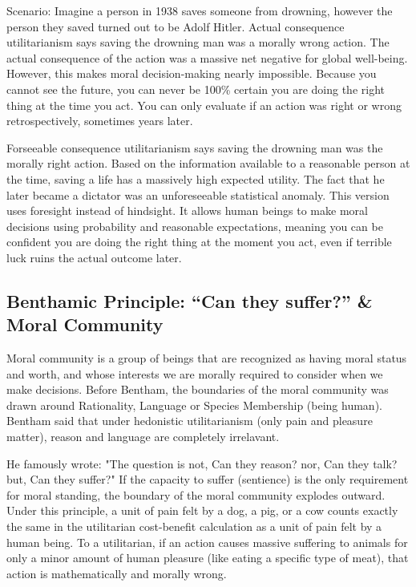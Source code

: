 \documentclass[12pt]{article}
\begin{document}
\noindent Scenario: Imagine a person in 1938 saves someone from drowning, however the person they saved turned out to be Adolf Hitler.
Actual consequence utilitarianism says saving the drowning man was a morally wrong action. The actual consequence of the action was a massive net negative for global well-being.
However, this makes moral decision-making nearly impossible. Because you cannot see the future, you can never be 100\% certain you are doing the right thing at the time you act. 
You can only evaluate if an action was right or wrong retrospectively, sometimes years later.

\noindent Forseeable consequence utilitarianism says saving the drowning man was the morally right action.
Based on the information available to a reasonable person at the time, saving a life has a massively high expected utility. The fact that he later became a dictator was an unforeseeable statistical anomaly.
This version uses foresight instead of hindsight. It allows human beings to make moral decisions using probability and reasonable expectations, meaning you can be confident you are doing the right thing at the moment you act, even if terrible luck ruins the actual outcome later.

\subsection{Benthamic Principle: ``Can they suffer?'' \& Moral Community}
Moral community is a group of beings that are recognized as having moral status and worth, and whose interests we are morally required to consider when we make decisions.
Before Bentham, the boundaries of the moral community was drawn around Rationality, Language or Species Membership (being human).
Bentham said that under hedonistic utilitarianism (only pain and pleasure matter), reason and language are completely irrelavant.

\noindent He famously wrote: "The question is not, Can they reason? nor, Can they talk? but, Can they suffer?"
If the capacity to suffer (sentience) is the only requirement for moral standing, the boundary of the moral community explodes outward.
Under this principle, a unit of pain felt by a dog, a pig, or a cow counts exactly the same in the utilitarian cost-benefit calculation as a unit of pain felt by a human being.
To a utilitarian, if an action causes massive suffering to animals for only a minor amount of human pleasure (like eating a specific type of meat), that action is mathematically and morally wrong.
\end{document}
